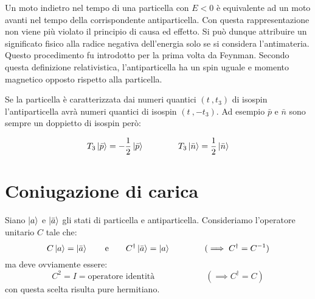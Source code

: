 Un moto indietro nel tempo di una particella con $E < 0$ è equivalente ad un
moto avanti nel tempo della corrispondente antiparticella. Con questa
rappresentazione non viene più violato il principio di causa ed effetto. Si può
dunque attribuire un significato fisico alla radice negativa dell'energia solo
se si considera l'antimateria. Questo procedimento fu introdotto per la prima
volta da Feynman. Secondo questa definizione relativistica, l'antiparticella ha
un spin uguale e momento magnetico opposto rispetto alla particella.

Se la particella è caratterizzata dai numeri quantici $( t \ , t_3)$ di isospin
l'antiparticella avrà numeri quantici di isospin $(t \ , - t_3)$.
Ad esempio $\bar{p}$ e $\bar{n}$ sono sempre un doppietto di isospin però:
 
 \begin{equation*}
 T_3 \Ket{\bar{p}} = -\dfrac{1}{2} \Ket{\bar{p}} \qquad \qquad T_3 \Ket{\bar{n}} = \dfrac{1}{2} \Ket{\bar{n}}
 \end{equation*}

\chapter{Coniugazione di carica}

Siano $\Ket{a}$ e $\Ket{\bar{a}}$ gli stati di particella e antiparticella.
Consideriamo l'operatore unitario $C$ tale che:
\begin{equation*}
C\Ket{a} = \Ket{\bar{a}} \qquad \text{e} \qquad C^\dag \Ket{\bar{a}} = \Ket{a}
\qquad \qquad (\implies C^\dag = C^{-1})
\end{equation*}
ma deve ovviamente essere:
\begin{equation*}
C^2 = I = \text{operatore identità} \qquad \qquad \qquad (\implies C^\dag = C)
\end{equation*}
con questa scelta risulta pure hermitiano. 

